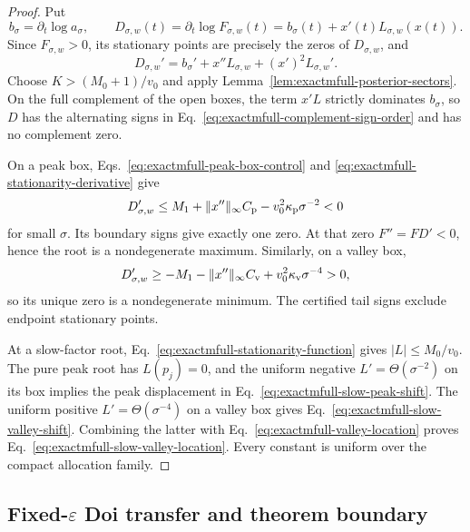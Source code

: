 \documentclass[aps,physrev,onecolumn,amsmath,amssymb,longbibliography]{revtex4-2}
\begin{document}
\begin{proof}
Put
\begin{equation}
 b_\sigma=\partial_t\log a_\sigma,
 \qquad
 D_{\sigma,w}(t)=\partial_t\log F_{\sigma,w}(t)
 =b_\sigma(t)+x'(t)L_{\sigma,w}(x(t)).
 \label{eq:exactmfull-stationarity-function}
\end{equation}
Since \(F_{\sigma,w}>0\), its stationary points are precisely the zeros of
\(D_{\sigma,w}\), and
\begin{equation}
 D_{\sigma,w}'
 =b_\sigma'+x''L_{\sigma,w}+(x')^2L_{\sigma,w}'.
 \label{eq:exactmfull-stationarity-derivative}
\end{equation}
Choose \(K>(M_0+1)/v_0\) and apply
Lemma~\ref{lem:exactmfull-posterior-sectors}.  On the full complement of the
open boxes, the term \(x'L\) strictly dominates \(b_\sigma\), so \(D\) has
the alternating signs in Eq.~\eqref{eq:exactmfull-complement-sign-order} and
has no complement zero.

On a peak box, Eqs.~\eqref{eq:exactmfull-peak-box-control} and
\eqref{eq:exactmfull-stationarity-derivative} give
\begin{equation}
 D_{\sigma,w}'
 \le M_1+\|x''\|_\infty C_{\rm p}
 -v_0^2\kappa_{\rm p}\sigma^{-2}<0
 \label{eq:exactmfull-peak-root-monotonicity}
\end{equation}
for small \(\sigma\).  Its boundary signs give exactly one zero.  At that
zero \(F''=FD'<0\), hence the root is a nondegenerate maximum.  Similarly,
on a valley box,
\begin{equation}
 D_{\sigma,w}'
 \ge-M_1-\|x''\|_\infty C_{\rm v}
 +v_0^2\kappa_{\rm v}\sigma^{-4}>0,
 \label{eq:exactmfull-valley-root-monotonicity}
\end{equation}
so its unique zero is a nondegenerate minimum.  The certified tail signs
exclude endpoint stationary points.

At a slow-factor root, Eq.~\eqref{eq:exactmfull-stationarity-function} gives
\(|L|\le M_0/v_0\).  The pure peak root has \(L(p_j)=0\), and the uniform
negative \(L'=\Theta(\sigma^{-2})\) on its box implies the peak displacement
in Eq.~\eqref{eq:exactmfull-slow-peak-shift}.  The uniform positive
\(L'=\Theta(\sigma^{-4})\) on a valley box gives
Eq.~\eqref{eq:exactmfull-slow-valley-shift}.  Combining the latter with
Eq.~\eqref{eq:exactmfull-valley-location} proves
Eq.~\eqref{eq:exactmfull-slow-valley-location}.  Every constant is uniform
over the compact allocation family.
\end{proof}

\subsection{Fixed-\texorpdfstring{\(\varepsilon\)}{epsilon} Doi transfer and
theorem boundary}
\label{subsec:exactmfull-doi-transfer}
\end{document}
